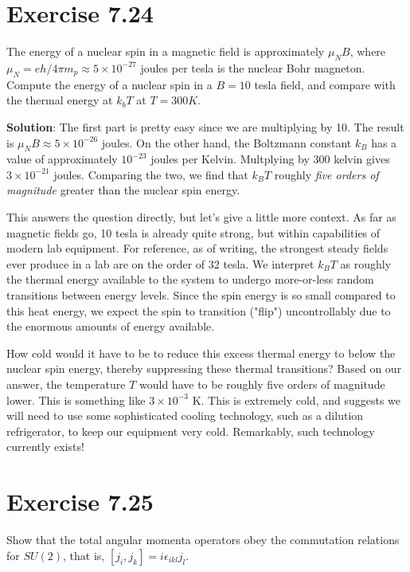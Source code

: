 \documentclass{book}
\begin{document}
\section*{Exercise 7.24}
    The energy of a nuclear spin in a magnetic field is approximately $\mu_N B$, where $\mu_N = eh/4\pi m_p \approx 5\times 10^{-27}$ joules per tesla is the nuclear Bohr magneton. Compute the energy of a nuclear spin in a $B=10$ tesla field, and compare with the thermal energy at $k_b T$ at $T = 300 K$.

    \textbf{Solution}: The first part is pretty easy since we are multiplying by 10. The result is $\mu_N B \approx 5 \times 10^{-26}$ joules. On the other hand, the Boltzmann constant $k_B$ has a value of approximately $10^{-23}$ joules per Kelvin. Multplying by 300 kelvin gives $3 \times 10^{-21}$ joules. Comparing the two, we find that $k_B T$ roughly \emph{five orders of magnitude} greater than the nuclear spin energy. 

    This answers the question directly, but let's give a little more context. As far as magnetic fields go, 10 tesla is already quite strong, but within capabilities of modern lab equipment. For reference, as of writing, the strongest steady fields ever produce in a lab are on the order of 32 tesla. We interpret $k_B T$ as roughly the thermal energy available to the system to undergo more-or-less random transitions between energy levels. Since the spin energy is so small compared to this heat energy, we expect the spin to transition ("flip") uncontrollably due to the enormous amounts of energy available. 

    How cold would it have to be to reduce this excess thermal energy to below the nuclear spin energy, thereby suppressing these thermal transitions? Based on our answer, the temperature $T$ would have to be roughly five orders of magnitude lower. This is something like $3 \times 10^{-3}$ K. This is extremely cold, and suggests we will need to use some sophisticated cooling technology, such as a dilution refrigerator, to keep our equipment very cold. Remarkably, such technology currently exists!

\section*{Exercise 7.25}
    Show that the total angular momenta operators obey the commutation relations for $SU(2)$, that is, $[j_i, j_k] = i \epsilon_{ikl} j_l$.
\end{document}
